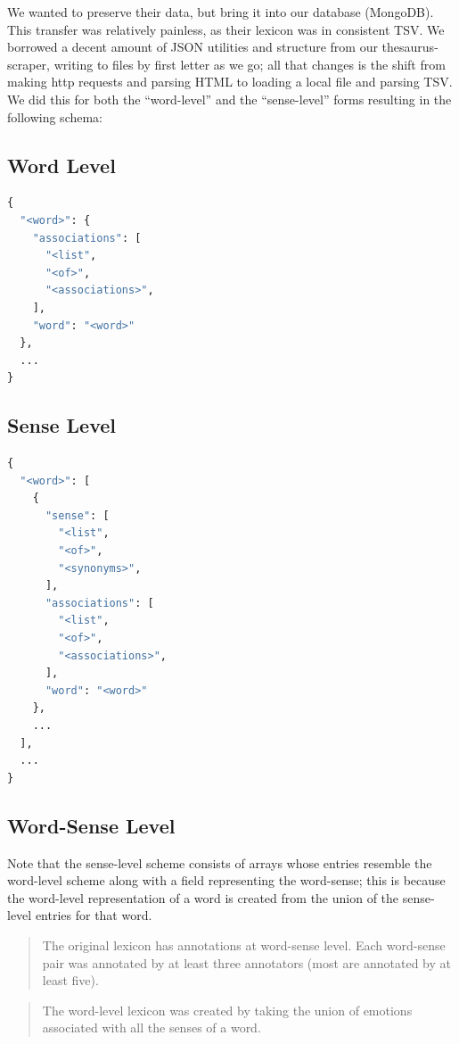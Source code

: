 \documentclass[11pt, twoside, reqno]{book}
\begin{document}
We wanted to preserve their data, but bring it into our database (MongoDB). This transfer was relatively painless, as their lexicon was in consistent TSV. We borrowed a decent amount of JSON utilities and structure from our thesaurus-scraper, writing to files by first letter as we go; all that changes is the shift from making http requests and parsing HTML to loading a local file and parsing TSV. We did this for both the ``word-level'' and the ``sense-level'' forms resulting in the following schema:

\subsection{Word Level}
\begin{lstlisting}[language=Python]
{
  "<word>": {
    "associations": [
      "<list",
      "<of>",
      "<associations>",
    ],
    "word": "<word>"
  },
  ...
}
\end{lstlisting}

\subsection{Sense Level}
\begin{lstlisting}[language=Python]
{
  "<word>": [
    {
      "sense": [
        "<list",
        "<of>",
        "<synonyms>",
      ],
      "associations": [
        "<list",
        "<of>",
        "<associations>",
      ],
      "word": "<word>"
    },
    ...
  ],
  ...
}
\end{lstlisting}

\subsection{Word-Sense Level}

Note that the sense-level scheme consists of arrays whose entries resemble the word-level scheme along with a field representing the word-sense; this is because the word-level representation of a word is created from the union of the sense-level entries for that word.

\begin{quote}
The original lexicon has annotations at word-sense level. Each word-sense pair was annotated by at least three annotators (most are annotated by at least five).
\end{quote}

\begin{quote}
The word-level lexicon was created by taking the union of emotions associated with all the senses of a word.
\end{quote}
\end{document}
